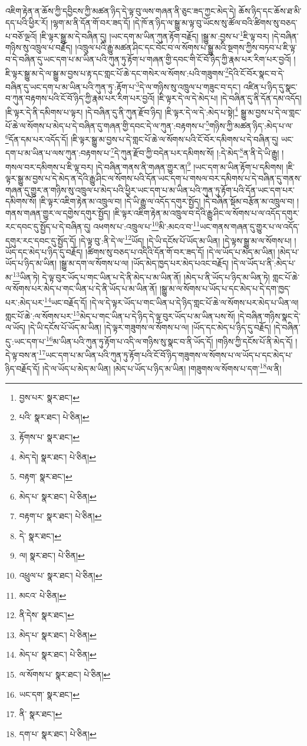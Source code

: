 འཇིག་རྟེན་ན་ཆོས་ཀྱི་དབྱིངས་ཀྱི་མཚན་ཉིད་དེ་ལྟ་བུ་ལས་གཞན་ནི་ཅུང་ཟད་ཀྱང་མེད་དེ། ཆོས་ཉིད་དང་ཆོས་ཐ་མི་དད་པའི་ཕྱིར་རོ། །ལྷག་མ་ནི་དོན་གོ་བར་ཟད་དོ། །དེ་ཁོ་ན་ཉིད་ལ་སྒྱུ་མ་ལྟ་བུ་ཡོངས་སུ་ཚོལ་བའི་ཚིགས་སུ་བཅད་པ་བཅོ་ལྔའོ། །ཇི་ལྟར་སྒྱུ་མ་དེ་བཞིན་དུ། །ཡང་དག་མ་ཡིན་ཀུན་རྟོག་བརྗོད། །སྒྱུ་མ་:བྱས་པ་\footnote{བྱས་པར་  སྣར་ཐང་། }ཇི་ལྟ་བར། །དེ་བཞིན་གཉིས་སུ་འཁྲུལ་པ་བརྗོད། །འཁྲུལ་པའི་རྒྱུ་མཚན་ཤིང་དང་བོང་བ་ལ་སོགས་པ་སྒྱུ་མའི་སྔགས་ཀྱིས་བཏབ་པ་ཇི་ལྟ་བ་དེ་བཞིན་དུ་ཡང་དག་པ་མ་ཡིན་པའི་ཀུན་ཏུ་རྟོག་པ་གཞན་གྱི་དབང་གི་ངོ་བོ་ཉིད་ཀྱི་རྣམ་པར་རིག་པར་བྱའོ། །ཇི་ལྟར་སྒྱུ་མ་དེ་ལ་སྒྱུ་མ་བྱས་པ་རྟ་དང་གླང་པོ་ཆེ་དང་གསེར་ལ་སོགས་:པའི་གཟུགས་\footnote{པའི་  སྣར་ཐང་།  པེ་ཅིན། }དེའི་ངོ་བོར་སྣང་བ་དེ་བཞིན་དུ་ཡང་དག་པ་མ་ཡིན་པའི་ཀུན་ཏུ་:རྟོག་པ་\footnote{རྟོགས་པ་  སྣར་ཐང་། }དེ་ལ་གཉིས་སུ་འཁྲུལ་པ་གཟུང་བ་དང་། འཛིན་པ་ཉིད་དུ་སྣང་བ་ཀུན་བརྟགས་པའི་ངོ་བོ་ཉིད་ཀྱི་རྣམ་པར་རིག་པར་བྱའོ། །ཇི་ལྟར་དེ་ལ་དེ་མེད་པ། །དེ་བཞིན་དུ་ནི་དོན་དམ་འདོད། །ཇི་ལྟར་དེ་ནི་དམིགས་པ་ལྟར། །དེ་བཞིན་དུ་ནི་ཀུན་རྫོབ་ཉིད། །ཇི་ལྟར་དེ་ལ་དེ་:མེད་པ་སྟེ།\footnote{མེད་དེ།  སྣར་ཐང་།  པེ་ཅིན། } སྒྱུ་མ་བྱས་པ་དེ་ལ་གླང་པོ་ཆེ་ལ་སོགས་པ་མེད་པ་དེ་བཞིན་དུ་གཞན་གྱི་དབང་དེ་ལ་ཀུན་:བརྟགས་པ་\footnote{བརྟག་  སྣར་ཐང་། }གཉིས་ཀྱི་མཚན་ཉིད་:མེད་པ་ལ་\footnote{མེད་པ་  སྣར་ཐང་།  པེ་ཅིན། }དོན་དམ་པར་འདོད་དོ། །ཇི་ལྟར་སྒྱུ་མ་བྱས་པ་དེ་གླང་པོ་ཆེ་ལ་སོགས་པའི་ངོ་བོར་དམིགས་པ་དེ་བཞིན་དུ། ཡང་དག་པ་མ་ཡིན་པ་ལས་ཀུན་:བརྟགས་པ་\footnote{བརྟག་པ་  སྣར་ཐང་།  པེ་ཅིན། }དེ་ཀུན་རྫོབ་ཀྱི་བདེན་པར་དམིགས་སོ། །:དེ་མེད་\footnote{དེ་  སྣར་ཐང་། }ན་ནི་དེ་ཡི་རྒྱུ། །གསལ་བར་དམིགས་པ་ཇི་ལྟ་བར། །དེ་བཞིན་གནས་ནི་གཞན་གྱུར་ན།\footnote{ལ།  སྣར་ཐང་།  པེ་ཅིན། } །ཡང་དག་མ་ཡིན་རྟོག་པ་དམིགས། །ཇི་ལྟར་སྒྱུ་མ་བྱས་པ་དེ་མེད་ན་དེའི་རྒྱུ་ཤིང་ལ་སོགས་པའི་དོན་ཡང་དག་པ་གསལ་བར་དམིགས་པ་དེ་བཞིན་དུ་གནས་གཞན་དུ་གྱུར་ན་གཉིས་སུ་འཁྲུལ་པ་མེད་པའི་ཕྱིར་ཡང་དག་པ་མ་ཡིན་པའི་ཀུན་ཏུ་རྟོག་པའི་དོན་ཡང་དག་པར་དམིགས་སོ། །ཇི་ལྟར་འཇིག་རྟེན་མ་འཁྲུལ་བ། །དེ་ཡི་རྒྱུ་ལ་འདོད་དགུར་སྤྱོད། །དེ་བཞིན་སྡོམ་བརྩོན་མ་འཁྲུལ་བ། །གནས་གཞན་གྱུར་ལ་དགྱེས་དགུར་སྤྱོད། །ཇི་ལྟར་འཇིག་རྟེན་མ་འཁྲུལ་བ་དེའི་རྒྱུ་ཤིང་ལ་སོགས་པ་ལ་འདོད་དགུར་རང་དབང་དུ་སྤྱོད་པ་དེ་བཞིན་དུ། འཕགས་པ་:འཁྲུལ་པ་\footnote{འཕྲུལ་པ་  སྣར་ཐང་།  པེ་ཅིན། }མི་:མངའ་བ་\footnote{མངའ་  པེ་ཅིན། }ཡང་གནས་གཞན་དུ་གྱུར་པ་ལ་འདོད་དགུར་རང་དབང་དུ་སྤྱོད་དོ། །དེ་ལྟ་བུ་:ནི་དེ་ལ་\footnote{ནི་དེས་  སྣར་ཐང་། }ཡོད། །དེ་ཡི་དངོས་པོ་ཡོད་མ་ཡིན། །དེ་ལྟས་སྒྱུ་མ་ལ་སོགས་པ། །ཡོད་དང་མེད་པ་ཉིད་དུ་བརྗོད། །ཚིགས་སུ་བཅད་པ་འདིའི་དོན་གོ་བར་ཟད་དོ། །དེ་ལ་ཡོད་པ་མེད་མ་ཡིན། །མེད་པ་ཡོད་པ་ཉིད་མ་ཡིན། །སྒྱུ་མ་དག་ལ་སོགས་པ་ལ། །ཡོད་མེད་ཁྱད་པར་མེད་པའང་བརྗོད། །དེ་ལ་ཡོད་པ་ནི་:མེད་པ་མ་\footnote{མེད་པ་  སྣར་ཐང་།  པེ་ཅིན། }ཡིན་ཏེ། དེ་ལྟ་བུར་ཡོད་པ་གང་ཡིན་པ་དེ་ནི་མེད་པ་མ་ཡིན་ནོ། །མེད་པ་ནི་ཡོད་པ་ཉིད་མ་ཡིན་ཏེ། གླང་པོ་ཆེ་ལ་སོགས་པར་མེད་པ་གང་ཡིན་པ་དེ་ནི་ཡོད་པ་མ་ཡིན་ནོ། །སྒྱུ་མ་ལ་སོགས་པ་ཡོད་པ་དང་མེད་པ་དེ་དག་ཁྱད་པར་:མེད་པར་\footnote{མེད་པ་  སྣར་ཐང་།  པེ་ཅིན། }ཡང་བརྗོད་དོ། །དེ་ལ་དེ་ལྟར་ཡོད་པ་གང་ཡིན་པ་དེ་ཉིད་གླང་པོ་ཆེ་ལ་སོགས་པར་མེད་པ་ཡིན་ལ། གླང་པོ་ཆེ་:ལ་སོགས་པར་\footnote{ལ་སོགས་པ་  སྣར་ཐང་།  པེ་ཅིན། }མེད་པ་གང་ཡིན་པ་དེ་ཉིད་དེ་ལྟ་བུར་ཡོད་པ་མ་ཡིན་པས་སོ། །དེ་བཞིན་གཉིས་སྣང་དེ་ལ་ཡོད། །དེ་ཡི་དངོས་པོ་ཡོད་མ་ཡིན། །དེ་ལྟར་གཟུགས་ལ་སོགས་པ་ལ། །ཡོད་དང་མེད་པ་ཉིད་དུ་བརྗོད། །དེ་བཞིན་དུ་:ཡང་དག་པ་\footnote{ཡང་དག་  སྣར་ཐང་། }མ་ཡིན་པའི་ཀུན་ཏུ་རྟོག་པ་འདི་ལ་གཉིས་སུ་སྣང་བ་ནི་ཡོད་དོ། །གཉིས་ཀྱི་དངོས་པོ་ནི་མེད་དོ། །དེ་ལྟ་བས་ན་\footnote{ནི་  སྣར་ཐང་། }ཡང་དག་པ་མ་ཡིན་པའི་ཀུན་ཏུ་རྟོག་པའི་ངོ་བོ་ཉིད་གཟུགས་ལ་སོགས་པ་ལ་ཡོད་པ་དང་མེད་པ་ཉིད་བརྗོད་དོ། །དེ་ལ་ཡོད་པ་མེད་མ་ཡིན། །མེད་པ་ཡོད་པ་ཉིད་མ་ཡིན། །གཟུགས་ལ་སོགས་པ་དག་\footnote{དག་པ་  སྣར་ཐང་།  པེ་ཅིན། }ལ་ནི། 